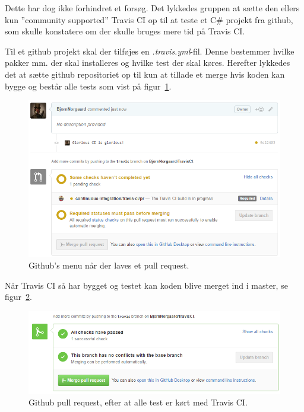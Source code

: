Dette har dog ikke forhindret et forsøg. Det lykkedes gruppen at sætte den ellers kun ''community supported'' Travis CI op til at teste et C\# projekt fra github, som skulle konstatere om der skulle bruges mere tid på Travis CI. 

Til et github projekt skal der tilføjes en \textit{.travis.yml}-fil. Denne bestemmer hvilke pakker mm. der skal installeres og hvilke test der skal køres. 
Herefter lykkedes det at sætte github repositoriet op til kun at tillade et merge hvis koden kan bygge og består alle tests som vist på figur~\ref{fig:travispullrequest}.

\begin{figure}[h]
	\centering
	\includegraphics[width=0.9\linewidth]{figs/processProjektGennemforsel/travis/travispullrequest}
	\caption{Github's menu når der laves et pull request.}
	\label{fig:travispullrequest}
\end{figure}

Når Travis CI så har bygget og testet kan koden blive merget ind i master, se figur~\ref{fig:travisgithubsuccess}.

\begin{figure}[h]
	\centering
	\includegraphics[width=0.9\linewidth]{figs/processProjektGennemforsel/travis/travisgithubsuccess}
	\caption{Github pull request, efter at alle test er kørt med Travis CI.}
	\label{fig:travisgithubsuccess}
\end{figure}

